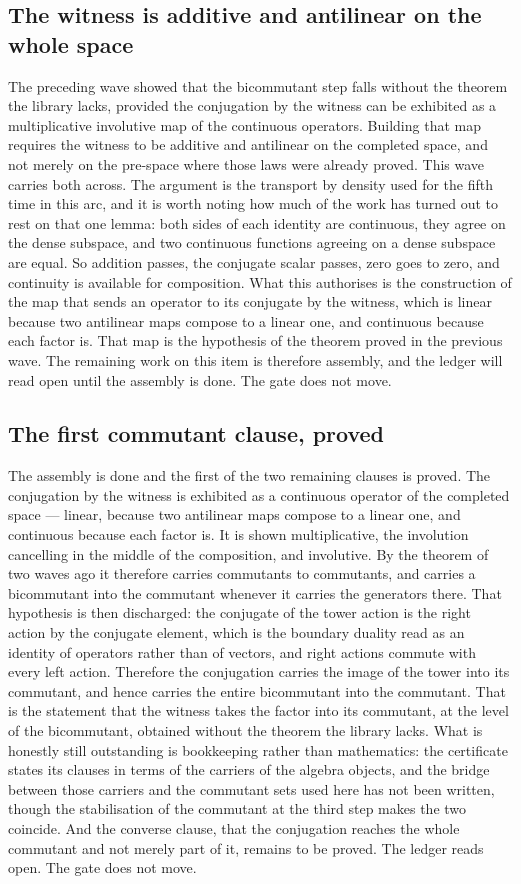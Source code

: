\documentclass[11pt]{article}
\theoremstyle{definition}\newtheorem{deriv}{Derivation}
\begin{document}
\subsection*{The witness is additive and antilinear on the whole space}The preceding wave showed that the bicommutant step falls without the theorem the library lacks, provided the conjugation by the witness can be exhibited as a multiplicative involutive map of the continuous operators. Building that map requires the witness to be additive and antilinear on the completed space, and not merely on the pre-space where those laws were already proved. This wave carries both across. The argument is the transport by density used for the fifth time in this arc, and it is worth noting how much of the work has turned out to rest on that one lemma: both sides of each identity are continuous, they agree on the dense subspace, and two continuous functions agreeing on a dense subspace are equal. So addition passes, the conjugate scalar passes, zero goes to zero, and continuity is available for composition. What this authorises is the construction of the map that sends an operator to its conjugate by the witness, which is linear because two antilinear maps compose to a linear one, and continuous because each factor is. That map is the hypothesis of the theorem proved in the previous wave. The remaining work on this item is therefore assembly, and the ledger will read open until the assembly is done. The gate does not move.

\subsection*{The first commutant clause, proved}The assembly is done and the first of the two remaining clauses is proved. The conjugation by the witness is exhibited as a continuous operator of the completed space --- linear, because two antilinear maps compose to a linear one, and continuous because each factor is. It is shown multiplicative, the involution cancelling in the middle of the composition, and involutive. By the theorem of two waves ago it therefore carries commutants to commutants, and carries a bicommutant into the commutant whenever it carries the generators there. That hypothesis is then discharged: the conjugate of the tower action is the right action by the conjugate element, which is the boundary duality read as an identity of operators rather than of vectors, and right actions commute with every left action. Therefore the conjugation carries the image of the tower into its commutant, and hence carries the entire bicommutant into the commutant. That is the statement that the witness takes the factor into its commutant, at the level of the bicommutant, obtained without the theorem the library lacks. What is honestly still outstanding is bookkeeping rather than mathematics: the certificate states its clauses in terms of the carriers of the algebra objects, and the bridge between those carriers and the commutant sets used here has not been written, though the stabilisation of the commutant at the third step makes the two coincide. And the converse clause, that the conjugation reaches the whole commutant and not merely part of it, remains to be proved. The ledger reads open. The gate does not move.
\end{document}

